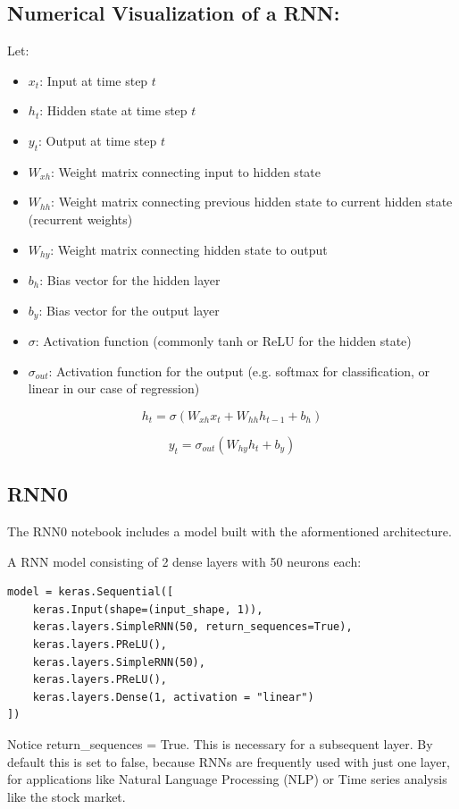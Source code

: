 \documentclass{article}
\begin{document}
\subsection{Numerical Visualization of a RNN:}
Let:
\begin{itemize}
    \item $x_t$: Input at time step $t$
    \item $h_t$: Hidden state at time step $t$
    \item $y_t$: Output at time step $t$
    \item $W_{xh}$: Weight matrix connecting input to hidden state
    \item $W_{hh}$: Weight matrix connecting previous hidden state to current hidden state (recurrent weights)
    \item $W_{hy}$: Weight matrix connecting hidden state to output
    \item $b_h$: Bias vector for the hidden layer
    \item $b_y$: Bias vector for the output layer
    \item $\sigma$: Activation function (commonly tanh or ReLU for the hidden state)
    \item $\sigma_{out}$: Activation function for the output (e.g. softmax for classification, or linear in our case of regression)
\end{itemize}



$$h_t = \sigma(W_{xh}x_t + W_{hh}h_{t-1} + b_h)$$

$$y_t = \sigma_{out}(W_{hy}h_t + b_y)$$


\subsection{RNN0}
The RNN0 notebook includes a model built with the aformentioned architecture.

A RNN model consisting of 2 dense layers with 50 neurons each:

\begin{Verbatim}
model = keras.Sequential([
    keras.Input(shape=(input_shape, 1)),
    keras.layers.SimpleRNN(50, return_sequences=True),
    keras.layers.PReLU(),
    keras.layers.SimpleRNN(50),
    keras.layers.PReLU(),
    keras.layers.Dense(1, activation = "linear")
])
\end{Verbatim}
Notice return\_sequences = True. This is necessary for a subsequent layer. 
By default this is set to false, because RNNs are frequently used with just 
one layer, for applications like Natural Language Processing (NLP) or Time 
series analysis like the stock market.
\end{document}
